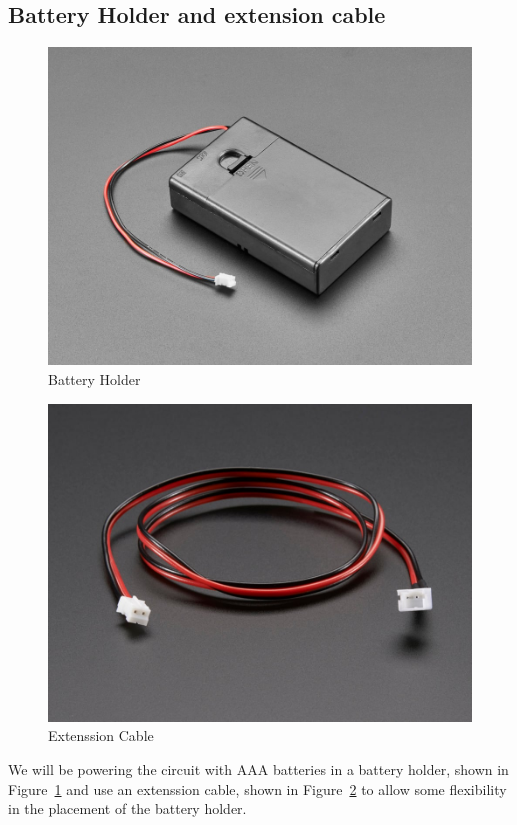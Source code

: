 \documentclass[letterpaper,twoside,12pt]{article}
\begin{document}
\subsection{Battery Holder and extension cable}
\begin{figure}[hbpt]\begin{centering}%
\includegraphics[width=5in]{BatteryHolder.jpg}
\caption{Battery Holder}
\label{fig:batteryholder}
\end{centering}\end{figure}
\begin{figure}[hbpt]\begin{centering}%
\includegraphics[width=5in]{ExtenssionCable.jpg}
\caption{Extenssion Cable}
\label{fig:extenssioncable}
\end{centering}\end{figure}
We will be powering the circuit with AAA batteries in a battery holder, shown 
in Figure~\ref{fig:batteryholder} and use an extenssion cable, shown in 
Figure~\ref{fig:extenssioncable} to allow some flexibility in the placement of 
the battery holder.
\clearpage
\end{document}
